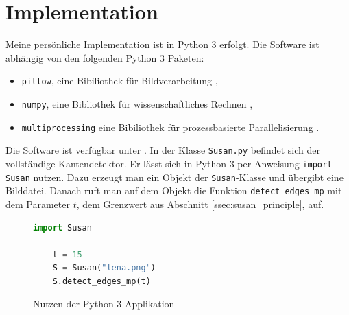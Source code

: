 \documentclass[a4paper, 11pt]{report}
\theoremstyle{definition}
\begin{document}
		\section{Implementation}\label{sec:implementation}
		Meine persönliche Implementation ist in Python 3 erfolgt. Die Software ist abhängig von den folgenden Python 3 Paketen:
		\begin{itemize}
			\item \texttt{pillow}, eine Bibiliothek für Bildverarbeitung \cite{pillow},
			\item \texttt{numpy}, eine Bibliothek für wissenschaftliches Rechnen \cite{numpy},
			\item \texttt{multiprocessing} eine Bibiliothek für prozessbasierte Parallelisierung \cite{multiprocessing}.
		\end{itemize}
		Die Software ist verfügbar unter \cite{mysoftware}. In der Klasse \texttt{Susan.py} befindet sich der vollständige Kantendetektor. Er lässt sich in Python 3 per Anweisung \texttt{import Susan} nutzen. Dazu erzeugt man ein Objekt der \texttt{Susan}-Klasse und übergibt eine Bilddatei. Danach ruft man auf dem Objekt die Funktion \texttt{detect\_edges\_mp} mit dem Parameter $t$, dem Grenzwert aus Abschnitt \ref{ssec:susan_principle}, auf.

		\begin{figure}[H] \centering
			\begin{lstlisting}[language=Python]
	import Susan

	t = 15
	S = Susan("lena.png")
	S.detect_edges_mp(t)
			\end{lstlisting}
		\caption{Nutzen der Python 3 Applikation}
		\label{fig:minimal-working-example}
		\end{figure}
\end{document}
